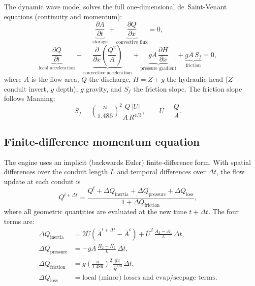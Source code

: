 \documentclass[11pt,a4paper]{article}
\begin{document}
The dynamic wave model solves the full one-dimensional de~Saint-Venant
equations (continuity and momentum):
\begin{equation}
  \underbrace{\frac{\partial A}{\partial t}}_{\text{storage}} +
  \underbrace{\frac{\partial Q}{\partial x}}_{\text{convective flux}}
  = 0,
  \label{eq:sv-cont}
\end{equation}
\begin{equation}
  \underbrace{\frac{\partial Q}{\partial t}}_{\text{local acceleration}} +
  \underbrace{\frac{\partial}{\partial x}\!\left(\frac{Q^{2}}{A}\right)}_{\text{convective acceleration}}
  + \underbrace{gA\,\frac{\partial H}{\partial x}}_{\text{pressure gradient}}
  + \underbrace{gA\,S_f}_{\text{friction}}
  = 0,
  \label{eq:sv-mom}
\end{equation}
where $A$ is the flow area, $Q$ the discharge, $H = Z + y$ the hydraulic head
($Z$ conduit invert, $y$ depth), $g$ gravity, and $S_f$ the friction slope.
The friction slope follows Manning:
\begin{equation}
  S_f = \left(\frac{n}{1.486}\right)^{2}
  \frac{Q\,\lvert U \rvert}{A\,R^{4/3}},
  \qquad U = \frac{Q}{A}.
\end{equation}

\subsection{Finite-difference momentum equation}

The engine uses an implicit (backwards Euler) finite-difference form. With
spatial differences over the conduit length $L$ and temporal differences over
$\Delta t$, the flow update at each conduit is
\begin{equation}
  Q^{t+\Delta t}
  = \frac{Q^{t} + \Delta Q_{\mathrm{inertia}} + \Delta Q_{\mathrm{pressure}}
        + \Delta Q_{\mathrm{loss}}}
         {1 + \Delta Q_{\mathrm{friction}}},
  \label{eq:mom-update}
\end{equation}
where all geometric quantities are evaluated at the new time $t + \Delta t$.
The four terms are:
\begin{align}
  \Delta Q_{\mathrm{inertia}}
    &= 2\bar{U}\left(\bar{A}^{t+\Delta t} - \bar{A}^{t}\right)
       + \bar{U}^{2}\,\frac{A_2 - A_1}{L}\,\Delta t, \label{eq:mom-inertia}\\
  \Delta Q_{\mathrm{pressure}}
    &= -g\bar{A}\,\frac{H_2 - H_1}{L}\,\Delta t, \label{eq:mom-pressure}\\
  \Delta Q_{\mathrm{friction}}
    &= g\left(\frac{n}{1.486}\right)^{2}
       \frac{\lvert \bar{U} \rvert}{\bar{R}^{4/3}}\,\Delta t, \label{eq:mom-friction}\\
  \Delta Q_{\mathrm{loss}}
    &= \text{local (minor) losses and evap/seepage terms}.
\end{align}
\end{document}
